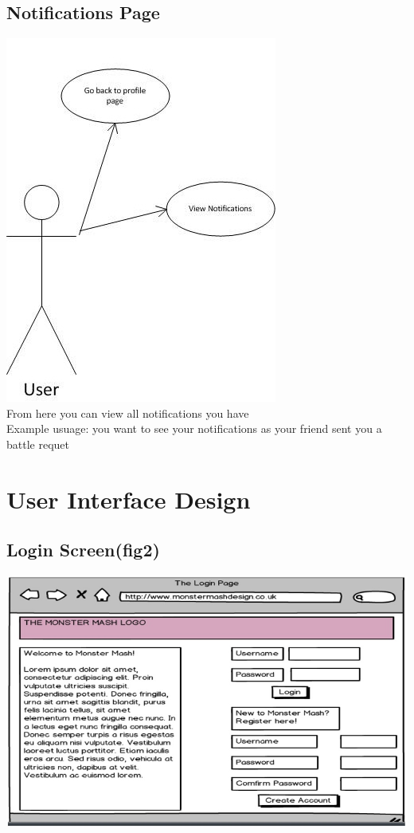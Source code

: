 \documentclass{project}
\begin{document}
\subsection{Notifications Page}
\includegraphics[scale=0.6]{NotificationsPageUsecase.jpg}
\\
From here you can view all notifications you have
\\
Example usuage: you want to see your notifications as your friend sent you a battle requet


\section{User Interface Design}

\subsection{Login Screen(fig2)}
\includegraphics[scale=0.6]{loginPage.jpg}
\end{document}
